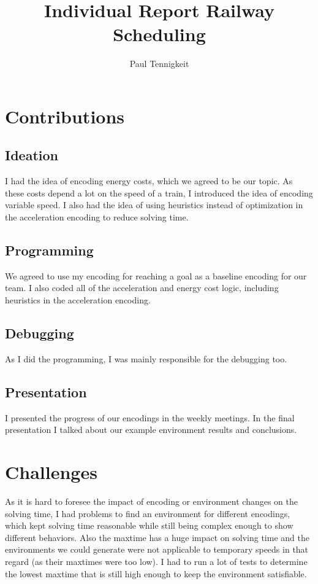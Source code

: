 \documentclass{llncs}
\begin{document}
\title{Individual Report Railway Scheduling}

\author{Paul Tennigkeit\newline
{}}


\maketitle              

\section{Contributions}
\subsection{Ideation}
I had the idea of encoding energy costs, which we agreed to be our topic. As these costs depend a lot on the speed of a train, I introduced the idea of encoding variable speed. I also had the idea of using heuristics instead of optimization in the acceleration encoding to reduce solving time.

\subsection{Programming}
We agreed to use my encoding for reaching a goal as a baseline encoding for our team. I also coded all of the acceleration and energy cost logic, including heuristics in the acceleration encoding.

\subsection{Debugging}
As I did the programming, I was mainly responsible for the debugging too.
\subsection{Presentation}

I presented the progress of our encodings in the weekly meetings. In the final presentation I talked about our example environment results and conclusions.

\section{Challenges}
As it is hard to foresee the impact of encoding or environment changes on the solving time, I had problems to find an environment for different encodings, which kept solving time reasonable while still being complex enough to show different behaviors. Also the maxtime has a huge impact on solving time and the environments we could generate were not applicable to temporary speeds in that regard (as their maxtimes were too low). I had to run a lot of tests to determine the lowest maxtime that is still high enough to keep the environment satisfiable.
\end{document}
